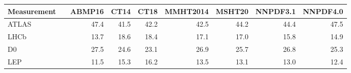 \begin{tabular}{l@{\extracolsep{\fill}}rrrrrrrr}
  \hline \hline
Measurement             &               &    ABMP16  &      CT14  &      CT18  &  MMHT2014  &    MSHT20  &   NNPDF3.1  &   NNPDF4.0 \\
\hline 
                           ATLAS   &   &    47.4  &    41.5  &    42.2  &    42.5  &    44.2  &    44.4  &    47.5 \\
                          LHCb  &     &    13.7  &    18.6  &    18.4  &    17.1  &    17.0  &    15.8  &    14.9 \\
                          D0 &    &    27.5  &    24.6  &    23.1  &    26.9  &    25.7  &    26.8  &    25.3 \\
                        LEP  &      &    11.5  &    15.3  &    16.2  &    13.5  &    13.1  &    13.0  &    12.4 \\
\hline \hline 
\end{tabular}
